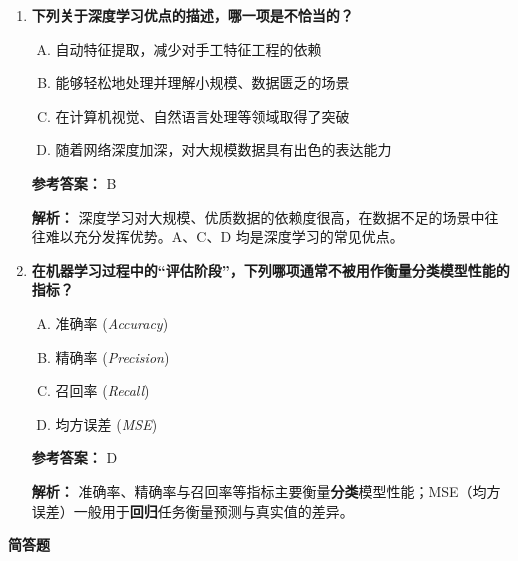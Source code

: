 \begin{enumerate}
  \textbf{参考答案：} B

  \textbf{解析：}  
  CNN 通过卷积与池化操作捕捉图像局部特征并减少参数量，最常用于图像与视频处理；RNN 适合序列数据；GAN 属于生成模型；FNN 结构简单，对图像的特征提取能力较弱。

  \item \textbf{下列关于深度学习优点的描述，哪一项是不恰当的？}
  \begin{enumerate}[A.]
    \item 自动特征提取，减少对手工特征工程的依赖
    \item 能够轻松地处理并理解小规模、数据匮乏的场景
    \item 在计算机视觉、自然语言处理等领域取得了突破
    \item 随着网络深度加深，对大规模数据具有出色的表达能力
  \end{enumerate}

  \textbf{参考答案：} B

  \textbf{解析：}  
  深度学习对大规模、优质数据的依赖度很高，在数据不足的场景中往往难以充分发挥优势。A、C、D 均是深度学习的常见优点。

  \item \textbf{在机器学习过程中的“评估阶段”，下列哪项通常不被用作衡量分类模型性能的指标？}
  \begin{enumerate}[A.]
    \item 准确率 (\textit{Accuracy})
    \item 精确率 (\textit{Precision})
    \item 召回率 (\textit{Recall})
    \item 均方误差 (\textit{MSE})
  \end{enumerate}

  \textbf{参考答案：} D

  \textbf{解析：}  
  准确率、精确率与召回率等指标主要衡量\textbf{分类}模型性能；MSE（均方误差）一般用于\textbf{回归}任务衡量预测与真实值的差异。

\end{enumerate}

\textbf{简答题}

